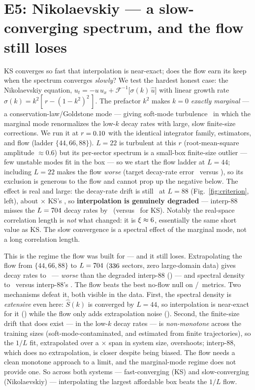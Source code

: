 \documentclass[11pt]{article}
\newcommand{\Shat}{\hat S}
\begin{document}
\section{E5: Nikolaevskiy --- a slow-converging spectrum, and the flow still loses}
\label{sec:e5}
KS converges so fast that interpolation is near-exact; does the flow earn its keep
when the spectrum converges \emph{slowly}? We test the hardest honest case:
the Nikolaevskiy equation,
$u_t = -u\,u_x + \mathcal{F}^{-1}\!\big[\sigma(k)\,\hat u\big]$ with linear growth
rate $\sigma(k)=k^2[\,r-(1-k^2)^2\,]$. The prefactor $k^2$ makes $k{=}0$ \emph{exactly
marginal} --- a conservation-law/Goldstone mode --- giving soft-mode
turbulence~\citep{nikolaevskiy1989,tribelsky1996,matthews2000} in which the
marginal mode renormalizes the low-$k$ decay rates with large, slow finite-size
corrections. We run it at $r=0.10$ with the identical integrator family,
estimators, and flow (ladder $\{44,66,88\}$). $L=22$ is turbulent at this $r$
(root-mean-square amplitude $\approx0.6$) but its per-sector spectrum is a
small-box finite-size outlier --- few unstable modes fit in the box --- so we start
the flow ladder at $L=44$; including $L=22$ makes the flow \emph{worse}
(target decay-rate error \NikFlowGammaWithSmallest\ versus \NikFlowGamma), so its
exclusion is generous to the flow and cannot prop up the negative below. The effect
is real and large: the decay-rate drift is still \NikConvEightEight\ at $L=88$
(Fig.~\ref{fig:criterion}, left), about \NikDriftRatioKS$\times$ KS's
\ConvEightEightGamma, so \textbf{interpolation is genuinely degraded} --- interp-88
misses the $L=704$ decay rates by \NikInterpGamma\ (versus
\InterpEightEightGamma\ for KS). Notably the real-space correlation length
is \emph{not} what changed: it is $\xi\approx6$, essentially the
same short value as KS. The slow convergence is a spectral effect of the marginal
mode, not a long correlation length.

This is the regime the flow was built for --- and it still loses. Extrapolating the
flow from $\{44,66,88\}$ to $L=704$ ($336$ sectors, zero
large-domain data) gives decay rates to \NikFlowGamma\ --- \emph{worse} than the
degraded interp-88 (\NikInterpGamma) --- and spectral density to \NikFlowSPct\
versus interp-88's \NikInterpSPct. The flow beats the best no-flow null on
\NikFlowWins/\NikNumMetrics\ metrics. Two mechanisms defeat it, both visible in the
data. First,
the spectral density is \emph{extensive} even here: $\Shat(k)$ is converged by
$L=44$, so interpolation is near-exact for it (\NikInterpSPct) while the flow only
adds extrapolation noise (\NikFlowSPct). Second, the finite-size drift that does
exist --- in the low-$k$ decay rates --- is \emph{non-monotone} across the training
sizes (soft-mode-contaminated, and estimated from finite trajectories), so the
$1/L$ fit, extrapolated over a \NikTargetOverBox$\times$ span in system size,
overshoots; interp-88,
which does no extrapolation, is closer despite being biased. The flow needs a clean
monotone approach to a limit, and the marginal-mode regime does not provide one.
So across both systems --- fast-converging (KS) and slow-converging (Nikolaevskiy)
--- interpolating the largest affordable box beats the $1/L$ flow.
\end{document}
